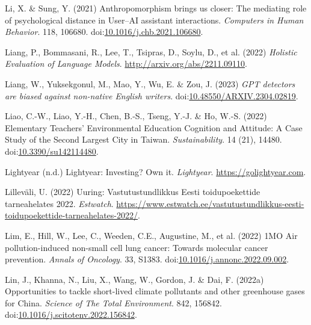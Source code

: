 \documentclass[
  letterpaper,
  DIV=11,
  numbers=noendperiod]{scrartcl}
\newlength{\cslhangindent}
\newenvironment{CSLReferences}[2] %
 {\begin{list}{}{%
  \setlength{\itemindent}{0pt}
  \setlength{\leftmargin}{0pt}
  \setlength{\parsep}{0pt}
  \ifodd #1
   \setlength{\leftmargin}{\cslhangindent}
   \setlength{\itemindent}{-1\cslhangindent}
  \fi
  \setlength{\itemsep}{#2\baselineskip}}}
 {\end{list}}
\begin{document}
\begin{CSLReferences}{0}{1}
Li, X. \& Sung, Y. (2021) Anthropomorphism brings us closer: {The}
mediating role of psychological distance in {User}--{AI} assistant
interactions. \emph{Computers in Human Behavior}. 118, 106680.
doi:\href{https://doi.org/10.1016/j.chb.2021.106680}{10.1016/j.chb.2021.106680}.

Liang, P., Bommasani, R., Lee, T., Tsipras, D., Soylu, D., et al. (2022)
\emph{Holistic {Evaluation} of {Language Models}}.
\url{http://arxiv.org/abs/2211.09110}.

Liang, W., Yuksekgonul, M., Mao, Y., Wu, E. \& Zou, J. (2023)
\emph{{GPT} detectors are biased against non-native {English} writers}.
doi:\href{https://doi.org/10.48550/ARXIV.2304.02819}{10.48550/ARXIV.2304.02819}.

Liao, C.-W., Liao, Y.-H., Chen, B.-S., Tseng, Y.-J. \& Ho, W.-S. (2022)
Elementary {Teachers}' {Environmental Education Cognition} and
{Attitude}: {A Case Study} of the {Second Largest City} in {Taiwan}.
\emph{Sustainability}. 14 (21), 14480.
doi:\href{https://doi.org/10.3390/su142114480}{10.3390/su142114480}.

Lightyear (n.d.) Lightyear: {Investing}? {Own} it. \emph{Lightyear}.
\url{https://golightyear.com}.

Lilleväli, U. (2022) Uuring: {Vastutustundlikkus Eesti} toidupoekettide
tarneahelates 2022. \emph{Estwatch}.
\url{https://www.estwatch.ee/vastutustundlikkus-eesti-toidupoekettide-tarneahelates-2022/}.

Lim, E., Hill, W., Lee, C., Weeden, C.E., Augustine, M., et al. (2022)
{1MO Air} pollution-induced non-small cell lung cancer: {Towards}
molecular cancer prevention. \emph{Annals of Oncology}. 33, S1383.
doi:\href{https://doi.org/10.1016/j.annonc.2022.09.002}{10.1016/j.annonc.2022.09.002}.

Lin, J., Khanna, N., Liu, X., Wang, W., Gordon, J. \& Dai, F. (2022a)
Opportunities to tackle short-lived climate pollutants and other
greenhouse gases for {China}. \emph{Science of The Total Environment}.
842, 156842.
doi:\href{https://doi.org/10.1016/j.scitotenv.2022.156842}{10.1016/j.scitotenv.2022.156842}.


\end{CSLReferences}
\end{document}
